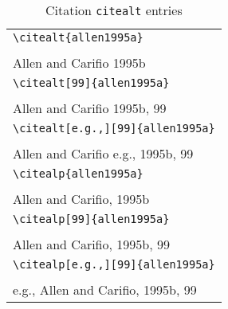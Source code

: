 \documentclass{article}
\begin{document}
\begin{table}
\begin{center}
\begin{tabular}{l}
    \verb#\citealt{allen1995a}# \\
    \citealt{allen1995a} \\
    Allen and Carifio 1995b\\
\hline
    \verb#\citealt[99]{allen1995a}# \\
    \citealt[99]{allen1995a} \\
    Allen and Carifio 1995b, 99\\
\hline
    \verb#\citealt[e.g.,][99]{allen1995a}# \\
    \citealt[e.g.,][99]{allen1995a} \\
    Allen and Carifio e.g., 1995b, 99\\
\hline
\hline
\verb#\citealp{allen1995a}# \\
    \citealp{allen1995a} \\
    Allen and Carifio, 1995b\\
\hline
    \verb#\citealp[99]{allen1995a}# \\
    \citealp[99]{allen1995a} \\
    Allen and Carifio, 1995b, 99\\
\hline
    \verb#\citealp[e.g.,][99]{allen1995a}# \\
    \citealp[e.g.,][99]{allen1995a} \\
    e.g., Allen and Carifio, 1995b, 99\\
\end{tabular}
\end{center}
\caption{Citation \texttt{citealt} entries}
\end{table}




%
\end{document}
